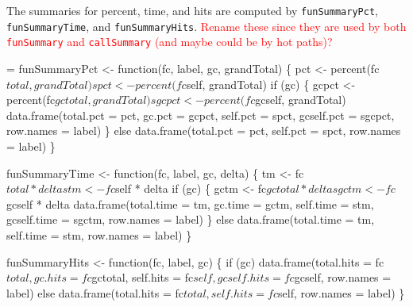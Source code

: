 \documentclass[11pt]{article}
\newcommand{\FIXME}[1]{\textcolor{red}{#1}}
\begin{document}
The summaries for percent, time, and hits are computed by
\Verb!funSummaryPct!, \Verb?funSummaryTime?, and \Verb+funSummaryHits+.
\FIXME{Rename these since they are used by both \Verb!funSummary! and
  \Verb!callSummary! (and maybe could be by hot paths)?}
\begin{nwchunk}
=
 funSummaryPct <- function(fc, label, gc, grandTotal) \{
     pct <- percent(fc$total, grandTotal)
     spct <- percent(fc$self, grandTotal)
     if (gc) \{
         gcpct <- percent(fc$gctotal, grandTotal)
         sgcpct <- percent(fc$gcself, grandTotal)
         data.frame(total.pct = pct, gc.pct = gcpct,
                    self.pct = spct, gcself.pct = sgcpct,
                    row.names = label)
     \}
     else
         data.frame(total.pct = pct, self.pct = spct, row.names = label)
 \}
 
 funSummaryTime <- function(fc, label, gc, delta) \{
     tm <- fc$total * delta
     stm <- fc$self * delta
     if (gc) \{
         gctm <- fc$gctotal * delta
         sgctm <- fc$gcself * delta
         data.frame(total.time = tm, gc.time = gctm,
                    self.time = stm, gcself.time = sgctm,
                    row.names = label)
     \}
     else
         data.frame(total.time = tm, self.time = stm, row.names = label)
 \}
 
 funSummaryHits <- function(fc, label, gc) \{
     if (gc)
         data.frame(total.hits = fc$total, gc.hits = fc$gctotal,
                    self.hits = fc$self, gcself.hits = fc$gcself,
                        row.names = label)
     else
         data.frame(total.hits = fc$total, self.hits = fc$self,
                    row.names = label)
 \}
\end{nwchunk}
\end{document}
